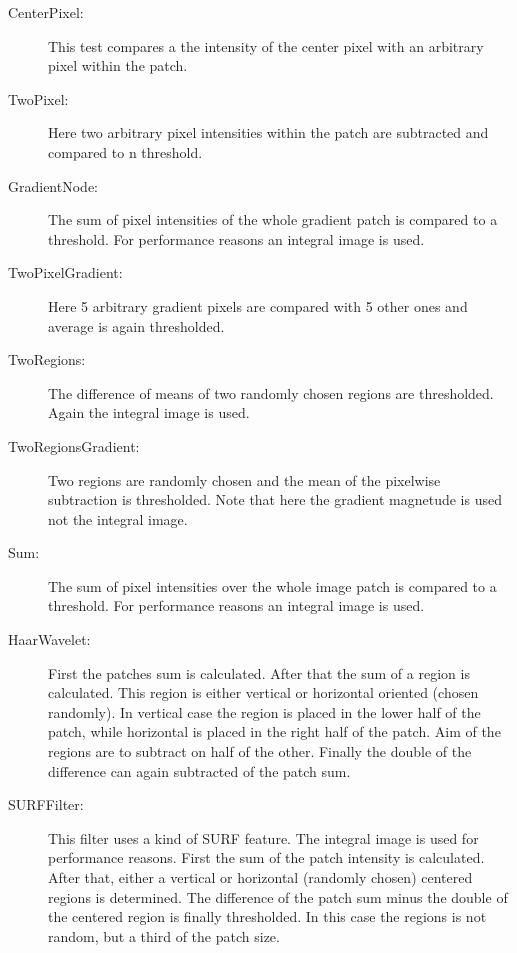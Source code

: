 \FloatBarrier
\begin{description}
\item[CenterPixel:]
This test compares a the intensity of the center pixel with an arbitrary pixel within the patch.

\item[TwoPixel:]
Here two arbitrary pixel intensities within the patch are subtracted and compared to n threshold.

\item[GradientNode:]
The sum of pixel intensities of the whole gradient patch is compared to a threshold. For performance reasons an integral image is used. 

\item[TwoPixelGradient:]
Here 5 arbitrary gradient pixels are compared with 5 other ones and average is again thresholded.

\item[TwoRegions:]
The difference of means of two randomly chosen regions are thresholded. Again the integral image is used.

\item[TwoRegionsGradient:]
Two regions are randomly chosen and the mean of the pixelwise subtraction is thresholded. Note that here the gradient magnetude is used not the integral image.

\item[Sum:]
The sum of pixel intensities over the whole image patch is compared to a threshold. For performance reasons an integral image is used.

\item[HaarWavelet:]
First the patches sum is calculated. After that the sum of a region is calculated. This region is either vertical or horizontal oriented (chosen randomly). In vertical case the region is placed in the lower half of the patch, while horizontal is placed in the right half of the patch. Aim of the regions are to subtract on half of the other. Finally the double of the difference can again subtracted of the patch sum.

\item[SURFFilter:]
This filter uses a kind of SURF feature. The integral image is used for performance reasons. First the sum of the patch intensity is calculated. After that, either a vertical or horizontal (randomly chosen) centered regions is determined. The difference of the patch sum minus the double of the centered region is finally thresholded. In this case the regions is not random, but a third of the patch size.
\end{description}



